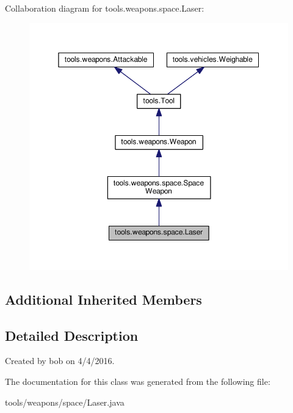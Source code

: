 Collaboration diagram for tools.\+weapons.\+space.\+Laser\+:
\nopagebreak
\begin{figure}[H]
\begin{center}
\leavevmode
\includegraphics[width=350pt]{classtools_1_1weapons_1_1space_1_1_laser__coll__graph}
\end{center}
\end{figure}
\subsection*{Additional Inherited Members}


\subsection{Detailed Description}
Created by bob on 4/4/2016. 

The documentation for this class was generated from the following file\+:\begin{DoxyCompactItemize}
\item 
tools/weapons/space/Laser.\+java\end{DoxyCompactItemize}
